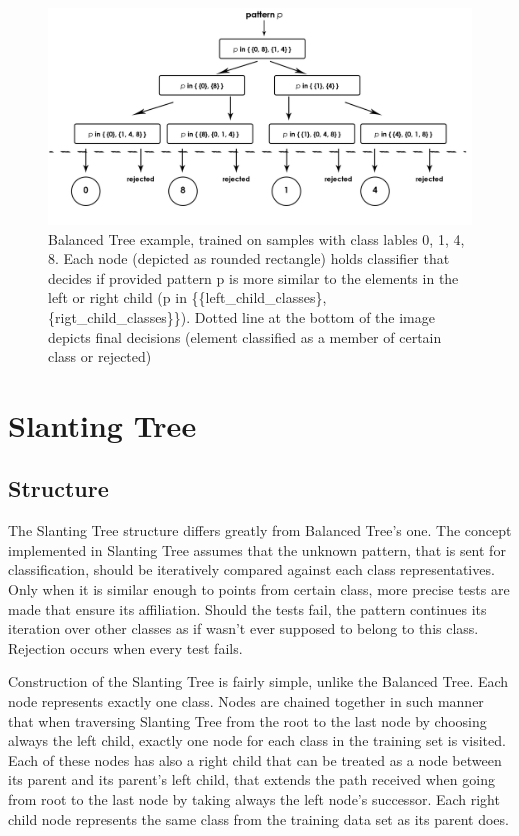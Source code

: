 \begin{figure}[!t]
	\centering
	\includegraphics[width=1\textwidth]{Figures/balanced_tree.jpg}
	\caption{Balanced Tree example, trained on samples with class lables 0, 1, 4, 8. Each node (depicted as rounded rectangle) holds classifier that decides if provided pattern p is more similar to the elements in the left or right child (p in \{\{left\_child\_classes\}, \{rigt\_child\_classes\}\}). Dotted line at the bottom of the image depicts final decisions (element classified as a member of certain class or rejected)}
	\label{fig:rejection_version1}\vspace{-3pt}
\end{figure}


\section{Slanting Tree}

\label{slanting_tree_description}

\subsection{Structure}

The Slanting Tree structure differs greatly from Balanced Tree's one. The concept implemented in Slanting Tree assumes that the unknown pattern, that is sent for classification, should be iteratively compared against each class representatives. Only when it is similar enough to points from certain class, more precise tests are made that ensure its affiliation. Should the tests fail, the pattern continues its iteration over other classes as if wasn't ever supposed to belong to this class. Rejection occurs when every test fails.

Construction of the Slanting Tree is fairly simple, unlike the Balanced Tree. Each node represents exactly one class. Nodes are chained together in such manner that when traversing Slanting Tree from the root to the last node by choosing always the left child, exactly one node for each class in the training set is visited. Each of these nodes has also a right child that can be treated as a node between its parent and its parent's left child, that extends the path received when going from root to the last node by taking always the left node's successor. Each right child node represents the same class from the training data set as its parent does.


